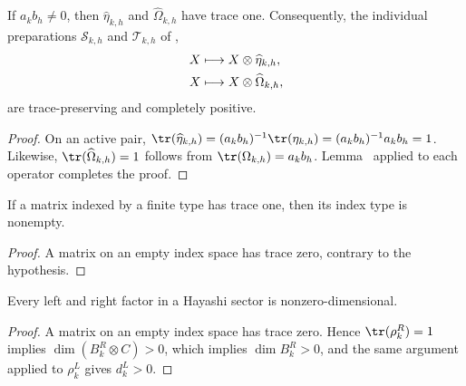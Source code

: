 \begin{lemma}
    \label{thm:mpdo_normalized_eta_omega_preparation}
    \leanok
    If $a_kb_h\ne0$, then $\widehat\eta_{k,h}$ and
    $\widehat\Omega_{k,h}$ have trace one.
    Consequently, the individual preparations $\mathcal S_{k,h}$ and
    $\mathcal T_{k,h}$ of
    \cite[Appendix~C.2, lines~1527--1535 and~1551--1555]
    {Cirac2016MPDO_arXiv},
    \begin{align}
        X & \longmapsto X\otimes\widehat\eta_{k,h}, \notag   \\
        X & \longmapsto X\otimes\widehat\Omega_{k,h}, \notag
    \end{align}
    are trace-preserving and completely positive.
\end{lemma}
\begin{proof}
    \leanok
    On an active pair,
    $\tr(\widehat\eta_{k,h})
        =(a_kb_h)^{-1}\tr(\eta_{k,h})
        =(a_kb_h)^{-1}a_kb_h=1$.
    Likewise, $\tr(\widehat\Omega_{k,h})=1$ follows from
    $\tr(\Omega_{k,h})=a_kb_h$.
    Lemma~\cite[``State preparation is trace-preserving completely positive'']{QICLean2026Blueprint} applied to each operator completes the proof.
\end{proof}

\begin{lemma}
    \label{lem:mpdo_trace_one_nonempty}
    \leanok
    If a matrix indexed by a finite type has trace one, then its index type
    is nonempty.
\end{lemma}
\begin{proof}
    \leanok
    A matrix on an empty index space has trace zero, contrary to the
    hypothesis.
\end{proof}

\begin{lemma}
    \label{lem:mpdo_hayashi_factor_nonempty}
    \leanok
    Every left and right factor in a Hayashi sector is nonzero-dimensional.
\end{lemma}
\begin{proof}
    \leanok
    A matrix on an empty index space has trace zero. Hence
    $\tr(\rho_k^R)=1$ implies
    $\dim(B_k^R\otimes C)>0$, which implies $\dim B_k^R>0$,
    and the same argument applied to $\rho_k^L$ gives $d_k^L>0$.
\end{proof}

